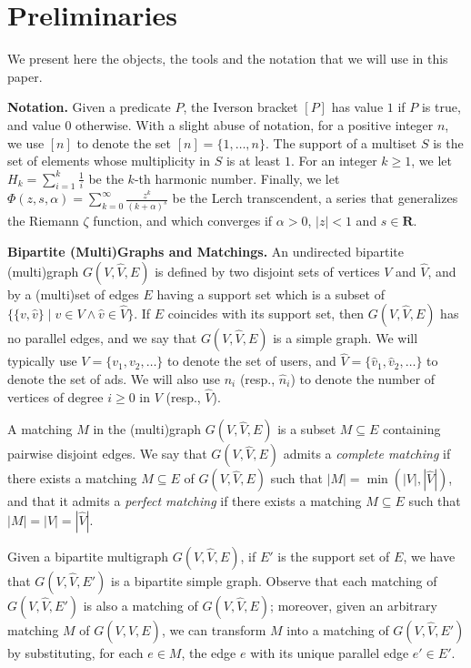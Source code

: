 \documentclass[11pt]{article}
\begin{document}
\section{Preliminaries}\label{sec:preliminaries}

We present here the objects, the tools and the notation that we will use in this paper.


\smallskip

{\bf  Notation.} Given a predicate $P$, the Iverson bracket $[P]$ has value $1$ if $P$ is true, and value $0$ otherwise. With a slight abuse of notation, for a positive integer $n$, we use $[n]$ to denote the set $[n] = \{1,\dots, n\}$.
The support  of a multiset $S$ is the set of elements whose multiplicity in $S$ is at least $1$.
 For an integer $k\geq 1$, we let $H_k=\sum_{i=1}^k \frac1i$ be the $k$-th harmonic number. Finally, we let $\Phi(z,s,\alpha)=\sum_{k=0}^\infty \frac{z^k}{(k+\alpha)^s}$ be the Lerch transcendent, a series that generalizes the Riemann $\zeta$ function, and which converges if $\alpha > 0$, $|z| < 1$ and $s \in \mathbf{R}$. 

\smallskip

{\bf Bipartite (Multi)Graphs and Matchings.} An undirected bipartite (multi)graph $G(V,\hat{V},E)$ is defined by two disjoint sets of vertices $V$ and $\hat{V}$, and by a (multi)set of edges $E$ having a support set which is a subset of $\{\{v,\hat{v}\} \mid v \in V \wedge \hat{v} \in \hat{V}\}$. If $E$ coincides with its support set, then $G(V,\hat{V},E)$ has no parallel edges, and we say that $G(V,\hat{V},E)$ is a simple graph. We will typically use $V=\{v_1, v_2, \dots\}$ to denote the set of users, and $\hat{V}=\{\hat{v}_1, \hat{v}_2, \dots\}$ to denote the set of ads. We will also use $n_i$ (resp., $\hat{n}_i$) to denote the number of vertices of degree $i\geq 0$ in $V$ (resp., $\hat{V}$). 

\smallskip

A matching $M$ in the (multi)graph $G(V,\hat{V},E)$ is a subset $M \subseteq E$ containing pairwise disjoint edges.
We say that $G(V,\hat{V},E)$ admits a {\em complete matching} if there exists a matching $M \subseteq E$ of $G(V,\hat{V},E)$ such that $|M| = \min(|V|,|\hat{V}|)$, and that it admits a {\em perfect matching} if there exists a matching $M \subseteq E$ such that $|M| = |V| = |\hat{V}|$.

\smallskip

Given a bipartite multigraph $G(V,\hat{V},E)$, if $E'$ is the support set of $E$, we have that $G(V,\hat{V},E')$ is a bipartite simple graph. Observe that each matching of $G(V,\hat{V},E')$ is also a matching of $G(V,\hat{V},E)$; moreover, given an arbitrary matching $M$ of $G(V,\hat{V},E)$, we can transform $M$ into a matching of $G(V,\hat{V},E')$ by substituting, for each $e \in M$, the edge $e$ with its unique parallel edge $e' \in E'$.
\end{document}
